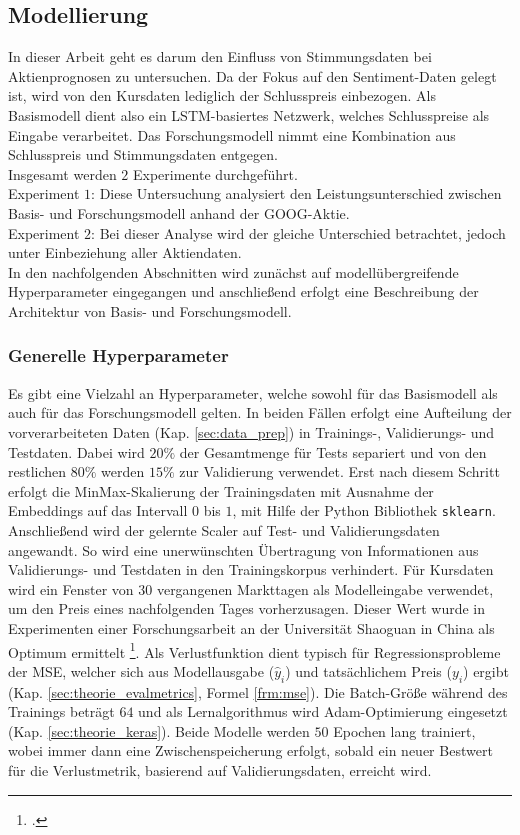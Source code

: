 \newpage
\subsection{Modellierung}\label{sec:modellierung}

In dieser Arbeit geht es darum den Einfluss von Stimmungsdaten bei Aktienprognosen zu untersuchen. Da der Fokus auf den Sentiment-Daten gelegt ist, wird von den Kursdaten lediglich der Schlusspreis einbezogen. Als Basismodell dient also ein LSTM-basiertes Netzwerk, welches Schlusspreise als Eingabe verarbeitet. Das Forschungsmodell nimmt eine Kombination aus Schlusspreis und Stimmungsdaten entgegen. \\
Insgesamt werden $2$ Experimente durchgeführt. \\
Experiment $1$:    
Diese Untersuchung analysiert den Leistungsunterschied zwischen Basis- und Forschungsmodell anhand der GOOG-Aktie. \\
Experiment $2$:   
Bei dieser Analyse wird der gleiche Unterschied betrachtet, jedoch unter Einbeziehung aller Aktiendaten. \\
In den nachfolgenden Abschnitten wird zunächst auf modellübergreifende Hyperparameter eingegangen und anschließend erfolgt eine Beschreibung der Architektur von Basis- und Forschungsmodell.

\subsubsection{Generelle Hyperparameter}\label{sec:modellierung_generell_hp}

Es gibt eine Vielzahl an Hyperparameter, welche sowohl für das Basismodell als auch für das Forschungsmodell gelten. 
In beiden Fällen erfolgt eine Aufteilung der vorverarbeiteten Daten (Kap. \ref{sec:data_prep}) in Trainings-, Validierungs- und Testdaten. Dabei wird $20\%$ der Gesamtmenge für Tests separiert und von den restlichen $80\%$ werden $15\%$ zur Validierung verwendet.
Erst nach diesem Schritt erfolgt die MinMax-Skalierung der Trainingsdaten mit Ausnahme der Embeddings auf das Intervall $0$ bis $1$, mit Hilfe der Python Bibliothek \texttt{sklearn}. Anschließend wird der gelernte Scaler auf Test- und Validierungsdaten angewandt. So wird eine unerwünschten Übertragung von Informationen aus Validierungs- und Testdaten in den Trainingskorpus verhindert. 
Für Kursdaten wird ein Fenster von $30$ vergangenen Markttagen als Modelleingabe verwendet, um den Preis eines nachfolgenden Tages vorherzusagen. Dieser Wert wurde in Experimenten einer Forschungsarbeit an der Universität Shaoguan in China als Optimum ermittelt \footcite[Tabelle 3]{xie2024deep}.
Als Verlustfunktion dient typisch für Regressionsprobleme der \ac{MSE}, welcher sich aus Modellausgabe ($\hat{y}_i$) und tatsächlichem Preis ($y_i$) ergibt (Kap. \ref{sec:theorie_evalmetrics}, Formel \ref{frm:mse}). 
Die Batch-Größe während des Trainings beträgt $64$ und als Lernalgorithmus wird Adam-Optimierung eingesetzt (Kap. \ref{sec:theorie_keras}). 
Beide Modelle werden $50$ Epochen lang trainiert, wobei immer dann eine Zwischenspeicherung erfolgt, sobald ein neuer Bestwert für die Verlustmetrik, basierend auf Validierungsdaten, erreicht wird.


